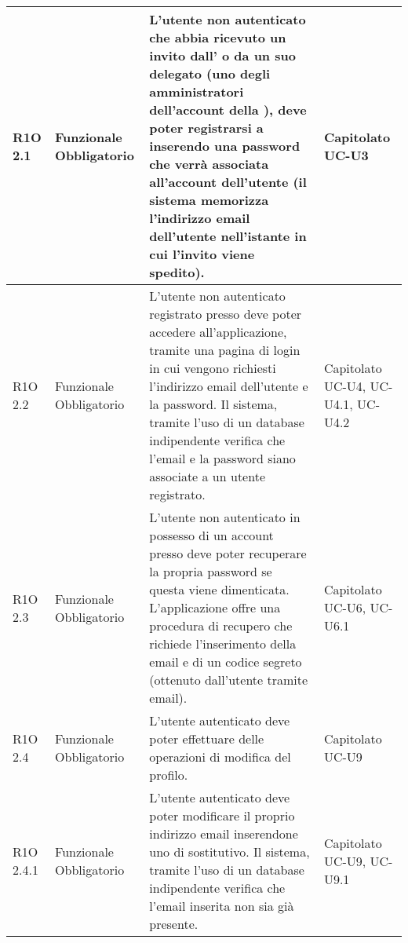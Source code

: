 \begin{center}
\begin{longtable}{ | l | p{2cm} | p{4.7cm} | p{2cm} |}
	R1O 2.1 & Funzionale \newline Obbligatorio & L’utente non autenticato che abbia ricevuto un invito dall’\glossaryItem{Owner} o da un suo delegato (uno degli amministratori dell’account della \glossaryItem{Company}), deve poter registrarsi a \glossaryItem{MaaS} inserendo una password che verrà associata all’account dell’utente (il sistema memorizza l’indirizzo email dell’utente nell’istante in cui l’invito viene spedito). &  Capitolato \newline UC-U3 \newline  \\ \hline
	 
	R1O 2.2 & Funzionale \newline Obbligatorio & L’utente non autenticato registrato presso \glossaryItem{MaaS} deve poter accedere all'applicazione, tramite una pagina di login in cui vengono richiesti l’indirizzo email dell’utente e la password. Il sistema, tramite l’uso di un database indipendente verifica che l’email e la password siano associate a un utente registrato.
&  Capitolato \newline UC-U4, UC-U4.1, UC-U4.2 \newline  \\ \hline
	
	R1O 2.3 & Funzionale \newline Obbligatorio & L’utente non autenticato in possesso di un account presso \glossaryItem{MaaS} deve poter recuperare la propria password se questa viene dimenticata.
L'applicazione offre una procedura di recupero che richiede l’inserimento della email e di un codice segreto (ottenuto dall’utente tramite email). &  Capitolato \newline UC-U6, UC-U6.1   \newline  \\ \hline
	
	R1O 2.4 & Funzionale \newline Obbligatorio & L’utente autenticato deve poter effettuare delle operazioni di modifica del profilo. &  Capitolato \newline  UC-U9  \newline  \\ \hline
	
	R1O 2.4.1 & Funzionale \newline Obbligatorio & L’utente autenticato deve poter modificare il proprio indirizzo email inserendone uno di sostitutivo. Il sistema, tramite l’uso di un database indipendente verifica che l’email inserita non sia già presente. &  Capitolato \newline  UC-U9, UC-U9.1  \newline  \\ \hline
	

\end{longtable}
\end{center}
